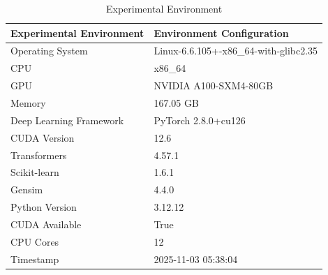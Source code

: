 \begin{table}
\caption{Experimental Environment}
\label{tab:env}
\begin{tabular}{ll}
\toprule
Experimental Environment & Environment Configuration \\
\midrule
Operating System & Linux-6.6.105+-x86_64-with-glibc2.35 \\
CPU & x86_64 \\
GPU & NVIDIA A100-SXM4-80GB \\
Memory & 167.05 GB \\
Deep Learning Framework & PyTorch 2.8.0+cu126 \\
CUDA Version & 12.6 \\
Transformers & 4.57.1 \\
Scikit-learn & 1.6.1 \\
Gensim & 4.4.0 \\
Python Version & 3.12.12 \\
CUDA Available & True \\
CPU Cores & 12 \\
Timestamp & 2025-11-03 05:38:04 \\
\bottomrule
\end{tabular}
\end{table}

